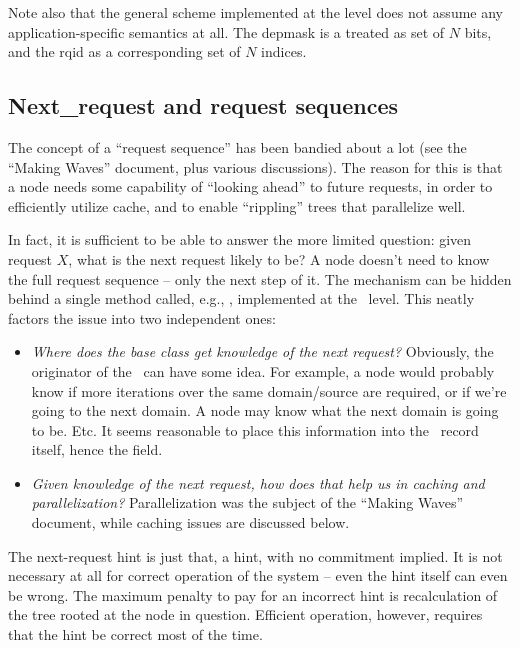 \documentclass[10pt,twoside]{book}
\begin{document}
  Note also that the general scheme implemented at the  level does not
  assume any application-specific semantics at all. The depmask is a treated as
  set of $N$ bits, and the rqid as a corresponding set of $N$ indices.

\subsection{Next\_request and request sequences}

  The concept of a ``request sequence'' has been bandied about a lot (see the
  ``Making Waves'' document, plus various discussions). The reason for this is
  that a node needs some capability of ``looking ahead'' to future requests, in
  order to efficiently utilize cache, and to enable ``rippling'' trees that
  parallelize well.

  In fact, it is sufficient to be able to answer the more limited question:
  given request $X$, what is the next request likely to be? A node doesn't 
  need to know the full request sequence -- only the next step of it. The
  mechanism can be hidden behind a single method called, e.g.,
  , implemented at the \Node\ level. This neatly
  factors the issue into two independent ones:

  \begin{itemize}
  
  \item {\em Where does the base  class get knowledge of the next
    request?} Obviously, the originator of the \Request\ can have some idea. 
    For example, a  node would probably know if more iterations over
    the same domain/source are required, or if we're going to the next domain.
    A  node may know what the next domain is going to be. Etc. It
    seems reasonable to place this information into the \Request\ record
    itself, hence the  field.

  \item {\em Given knowledge of the next request, how does that help us in
    caching and parallelization?} Parallelization was the subject of the
    ``Making Waves'' document, while caching issues are discussed below.

  \end{itemize}
  
  The next-request hint is just that, a hint, with no commitment implied. It is
  not necessary at all for correct operation of the system -- even the hint
  itself can even be wrong. The maximum penalty to pay for an incorrect hint is
  recalculation of the tree rooted at the node in question. Efficient
  operation, however, requires that the hint be correct most of the time.
\end{document}
